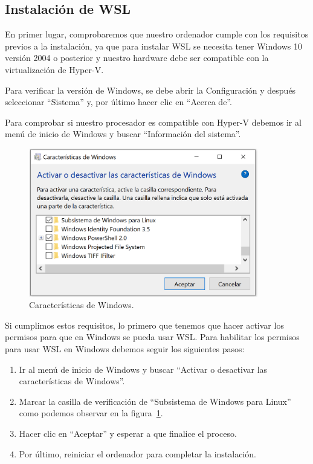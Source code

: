 \documentclass[a4paper, 12pt]{book}
\begin{document}
\subsection{Instalación de WSL} %
\label{sec:instalación de WSL}

En primer lugar, comprobaremos que nuestro ordenador cumple con los requisitos previos a la instalación, ya que para instalar WSL se necesita tener Windows 10 versión 2004 o posterior y nuestro hardware debe ser compatible con la virtualización de Hyper-V. 


Para verificar la versión de Windows, se debe abrir la Configuración y después seleccionar ``Sistema'' y, por último hacer clic en ``Acerca de''.


Para comprobar si nuestro procesador es compatible con Hyper-V debemos ir al menú de inicio de Windows y buscar ``Información del sistema''.

\begin{figure}
  \centering
  \includegraphics[width=10cm, keepaspectratio]{img/CaracteristicasWindows.PNG}
  \caption{Características de Windows.}\label{fig:CaracteristicasWindows}
\end{figure}


Si cumplimos estos requisitos, lo primero que tenemos que hacer activar los permisos para que en Windows se pueda usar WSL.
Para habilitar los permisos para usar WSL en Windows debemos seguir los siguientes pasos:
\begin{enumerate}
  \item Ir al menú de inicio de Windows y buscar ``Activar o desactivar las características de Windows''.
  \item Marcar la casilla de verificación de ``Subsistema de Windows para Linux'' como podemos observar en la figura~\ref{fig:CaracteristicasWindows}.
  \item Hacer clic en ``Aceptar'' y esperar a que finalice el proceso. 
  \item Por último, reiniciar el ordenador para completar la instalación.
\end{enumerate} 
  
\end{document}
